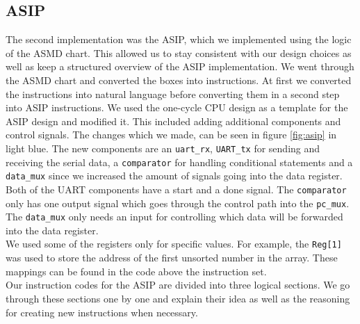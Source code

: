 \documentclass[conference]{IEEEtran}
\begin{document}
\subsection{ASIP}
The second implementation was the ASIP, which we implemented using the logic of the ASMD chart. This allowed us to stay consistent with our design choices as well as keep a structured overview of the ASIP implementation. We went through the ASMD chart and converted the boxes into instructions. At first we converted the instructions into natural language before converting them in a second step into ASIP instructions. We used the one-cycle CPU design as a template for the ASIP design and modified it. This included adding additional components and control signals. The changes which we made, can be seen in figure \ref{fig:asip} in light blue. The new components are an \texttt{uart\_rx}, \texttt{UART\_tx} for sending and receiving the serial data, a \texttt{comparator} for handling conditional statements and a \texttt{data\_mux} since we increased the amount of signals going into the data register. Both of the UART components have a start and a done signal. The \texttt{comparator} only has one output signal which goes through the control path into the \texttt{pc\_mux}. The \texttt{data\_mux} only needs an input for controlling which data will be forwarded into the data register.\\
We used some of the registers only for specific values. For example, the \texttt{Reg[1]} was used to store the address of the first unsorted number in the array. These mappings can be found in the code above the instruction set.\\
Our instruction codes for the ASIP are divided into three logical sections. We go through these sections one by one and explain their idea as well as the reasoning for creating new instructions when necessary.\\
\end{document}
